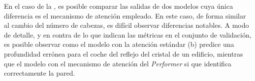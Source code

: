 \pagebreak




En el caso de la , es posible comparar las salidas de dos modelos cuya única diferencia es el mecanismo de atención empleado. En este caso, de forma similar al cambio del número de cabezas, es difícil observar diferencias notables. A modo de detalle, y en contra de lo que indican las métricas en el conjunto de validación, es posible observar como el modelo con la atención estándar (b) predice una profundidad errónea para el coche del reflejo del cristal de un edificio, mientras que el modelo con el mecanismo de atención del \textit{Performer} si que identifica correctamente la pared.










